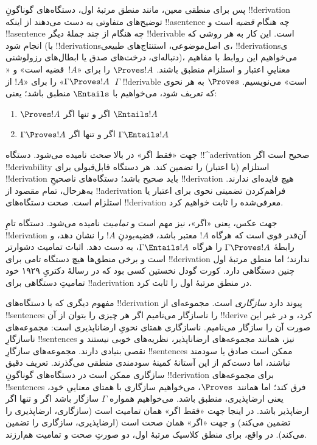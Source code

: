 \documentclass[../../../include/open-logic-section]{subfiles}
\begin{document}
پس برای منطقی معین، مانند منطق مرتبهٔ اول، دستگاه‌های گوناگونِ
!!{derivation} توضیح‌های متفاوتی به دست می‌دهند از اینکه !!a{sentence}
چه هنگام \emph{قضیه} است و !!a{sentence} چه هنگام از چند جملهٔ دیگر
!!{derivable} است. این کار به هر روشی که انجام شود (با !!{derivation}sی
اصل‌موضوعی، استنتاج‌های طبیعی، !!{derivation}sی دنباله‌ای، درخت‌های صدق
یا ابطال‌های رزولوشنی)، می‌خواهیم این روابط با مفاهیم معناییِ اعتبار و
استلزام منطبق باشند. $\Proves !A$ را برای «$!A$~قضیه است» و
«$\Gamma \Proves !A$» را برای «$!A$ از~$\Gamma$ !!{derivable} است»
می‌نویسیم. $\Proves$ به هر نحوی که تعریف شود، می‌خواهیم با $\Entails$
منطبق باشد؛ یعنی:
\begin{enumerate}
\item $\Proves !A$ اگر و تنها اگر $\Entails !A$
\item $\Gamma \Proves !A$ اگر و تنها اگر $\Gamma \Entails !A$
\end{enumerate}
جهت «فقط اگر» در بالا \emph{صحت} نامیده می‌شود. دستگاه
!!^a{derivation} صحیح است اگر !!{derivability} استلزام (یا اعتبار) را
تضمین کند.
هر دستگاه قابل‌قبولی برای !!{derivation} باید صحیح باشد؛ دستگاه‌های
ناصحیحِ !!{derivation} هیچ فایده‌ای ندارند. به‌هرحال، تمام مقصود از
!!a{derivation} فراهم‌کردن تضمینی نحوی برای اعتبار یا استلزام است.
صحت دستگاه‌های !!{derivation} معرفی‌شده را ثابت خواهیم کرد.

جهت عکس، یعنی «اگر»، نیز مهم است و \emph{تمامیت} نامیده می‌شود.
دستگاه تامِ !!{derivation} آن‌قدر قوی است که هرگاه $!A$ معتبر باشد،
قضیه‌بودنِ $!A$ را نشان دهد، و رابطهٔ $\Gamma \Proves !A$ را هرگاه
$\Gamma \Entails !A$، به دست دهد. اثبات تمامیت دشوارتر است و برخی
منطق‌ها هیچ دستگاه تامی برای !!{derivation} ندارند؛ اما منطق مرتبهٔ
اول چنین دستگاهی دارد. کورت گودل نخستین کسی بود که در رسالهٔ دکتریِ
۱۹۲۹ خود تمامیتِ دستگاهی برای !!a{derivation} در منطق مرتبهٔ اول را
ثابت کرد.

مفهوم دیگری که با دستگاه‌های !!{derivation} پیوند دارد \emph{سازگاری}
است. مجموعه‌ای از !!{sentence}s را ناسازگار می‌نامیم اگر هر چیزی را
بتوان از آن !!{derive} کرد، و در غیر این صورت آن را سازگار می‌نامیم.
ناسازگاری همتای نحویِ ارضاناپذیری است: مجموعه‌های ناسازگارِ
!!{sentence}s نیز، همانند مجموعه‌های ارضاناپذیر، نظریه‌های خوبی نیستند
و نقصی بنیادی دارند. مجموعه‌های سازگارِ !!{sentence}s ممکن است صادق
یا سودمند نباشند، اما دست‌کم از این آستانهٔ کمینهٔ سودمندی منطقی
می‌گذرند. تعریف دقیق سازگاری ممکن است در دستگاه‌های گوناگونِ
!!{derivation} برای مجموعه‌های !!{sentence}s فرق کند؛ اما
همانند~$\Proves$،
می‌خواهیم سازگاری با همتای معناییِ خود، یعنی ارضاپذیری، منطبق باشد.
می‌خواهیم همواره $\Gamma$ سازگار باشد اگر و تنها اگر ارضاپذیر باشد.
در اینجا جهت «فقط اگر» همان تمامیت است (سازگاری، ارضاپذیری را تضمین
می‌کند) و جهت «اگر» همان صحت است (ارضاپذیری، سازگاری را تضمین می‌کند).
در واقع، برای منطق کلاسیک مرتبهٔ اول، دو صورتِ صحت و تمامیت هم‌ارزند.
\end{document}
